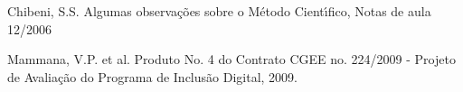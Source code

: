 \documentclass[
12pt,		%
openright,	%
twoside,  %
a4paper,			%
chapter=TITLE,		%
english,			%
french,				%
spanish,			%
brazil				%
]{USPSC-classe/USPSC}
\begin{document}
\begin{flushleft}
\begin{flushleft}
\begin{flushleft}
\begin{flushleft}
\begin{flushleft}
\begin{flushleft}
\begin{flushleft}
\begin{flushleft}
\begin{flushleft}
[CHIBENI, 2006] Chibeni, S.S. Algumas observa\c{c}\~oes sobre o M\'etodo Cient\'{\i}fico, Notas de aula 12/2006
\end{flushleft}


\end{flushleft}


\end{flushleft}


\end{flushleft}


\end{flushleft}


\end{flushleft}


\end{flushleft}


\end{flushleft}


\end{flushleft}


\begin{flushleft}
\begin{flushleft}
\begin{flushleft}
\begin{flushleft}
\begin{flushleft}
\begin{flushleft}
\begin{flushleft}
\begin{flushleft}
\begin{flushleft}
[CGEE, 2010a] Mammana, V.P. et al. Produto No. 4 do Contrato CGEE no. 224/2009 - Projeto de Avalia\c{c}\~ao do Programa de Inclus\~ao Digital, 2009.
\end{flushleft}


\end{flushleft}


\end{flushleft}


\end{flushleft}


\end{flushleft}


\end{flushleft}


\end{flushleft}


\end{flushleft}


\end{flushleft}
\end{document}
